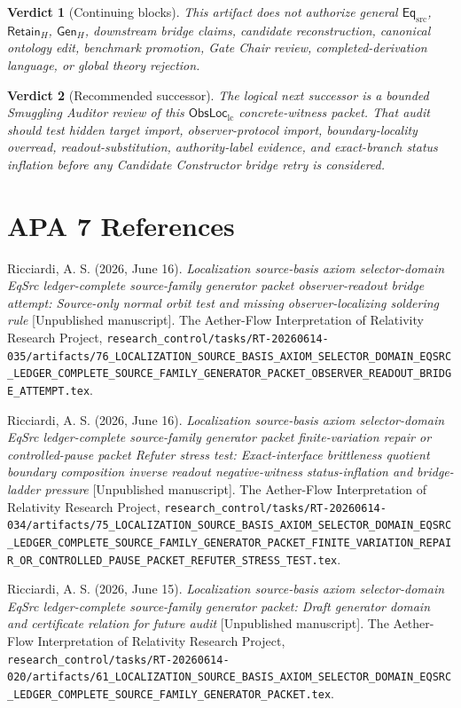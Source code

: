 \documentclass[11pt]{article}
\newcommand{\EqSrc}{\mathsf{Eq}_{\mathrm{src}}}
\newcommand{\ObsLocLC}{\mathsf{ObsLoc}_{\mathrm{lc}}}
\newcommand{\RetainH}{\mathsf{Retain}_{H}}
\newcommand{\GenH}{\mathsf{Gen}_{H}}
\newtheorem{verdict}{Verdict}
\begin{document}
\begin{verdict}[Continuing blocks]
This artifact does not authorize general \(\EqSrc\), \(\RetainH\),
\(\GenH\), downstream bridge claims, candidate reconstruction,
canonical ontology edit, benchmark promotion, Gate Chair review,
completed-derivation language, or global theory rejection.
\end{verdict}

\begin{verdict}[Recommended successor]
The logical next successor is a bounded Smuggling Auditor review of
this \(\ObsLocLC\) concrete-witness packet. That audit should test
hidden target import, observer-protocol import, boundary-locality
overread, readout-substitution, authority-label evidence, and
exact-branch status inflation before any Candidate Constructor bridge
retry is considered.
\end{verdict}

\section*{APA 7 References}

Ricciardi, A. S. (2026, June 16). \emph{Localization source-basis
axiom selector-domain EqSrc ledger-complete source-family generator
packet observer-readout bridge attempt: Source-only normal orbit test
and missing observer-localizing soldering rule} [Unpublished
manuscript]. The Aether-Flow Interpretation of Relativity Research
Project,
\texttt{research\_control/tasks/RT-20260614-035/artifacts/76\_LOCALIZATION\_SOURCE\_BASIS\_AXIOM\_SELECTOR\_DOMAIN\_EQSRC\_LEDGER\_COMPLETE\_SOURCE\_FAMILY\_GENERATOR\_PACKET\_OBSERVER\_READOUT\_BRIDGE\_ATTEMPT.tex}.

Ricciardi, A. S. (2026, June 16). \emph{Localization source-basis
axiom selector-domain EqSrc ledger-complete source-family generator
packet finite-variation repair or controlled-pause packet Refuter
stress test: Exact-interface brittleness quotient boundary
composition inverse readout negative-witness status-inflation and
bridge-ladder pressure} [Unpublished manuscript]. The Aether-Flow
Interpretation of Relativity Research Project,
\texttt{research\_control/tasks/RT-20260614-034/artifacts/75\_LOCALIZATION\_SOURCE\_BASIS\_AXIOM\_SELECTOR\_DOMAIN\_EQSRC\_LEDGER\_COMPLETE\_SOURCE\_FAMILY\_GENERATOR\_PACKET\_FINITE\_VARIATION\_REPAIR\_OR\_CONTROLLED\_PAUSE\_PACKET\_REFUTER\_STRESS\_TEST.tex}.

Ricciardi, A. S. (2026, June 15). \emph{Localization source-basis
axiom selector-domain EqSrc ledger-complete source-family generator
packet: Draft generator domain and certificate relation for future
audit} [Unpublished manuscript]. The Aether-Flow Interpretation of
Relativity Research Project,
\texttt{research\_control/tasks/RT-20260614-020/artifacts/61\_LOCALIZATION\_SOURCE\_BASIS\_AXIOM\_SELECTOR\_DOMAIN\_EQSRC\_LEDGER\_COMPLETE\_SOURCE\_FAMILY\_GENERATOR\_PACKET.tex}.
\end{document}
